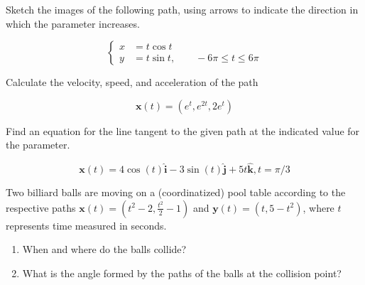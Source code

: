 \documentclass[12pt,letterpaper]{hmcpset}
\newcommand{\pn}[1]{\left( #1 \right)}
\renewcommand{\vec}[1]{\mathbf{#1}}
\let\oldhat\hat
\renewcommand{\hat}[1]{\oldhat{\mathbf{#1}}}
\begin{document}

\begin{problem}[3.1.3]
	Sketch the images of the following path, using arrows to indicate the direction in which the parameter increases.
    
    \[
    	\begin{cases}
        	x &= t \cos{t} \\
            y &= t \sin{t},\hspace{2em} -6 \pi \leq t \leq 6 \pi
        \end{cases}
    \]
\end{problem}

\begin{solution}
	
\end{solution}

\vfill
\newpage

\begin{problem}[3.1.10]
	Calculate the velocity, speed, and acceleration of the path
    
    \[
    	\vec{x}(t) = \pn{e^t, e^{2t}, 2e^t}
    \]
\end{problem}

\begin{solution}
	
\end{solution}

\vfill
\newpage

\begin{problem}[3.1.16]
	Find an equation for the line tangent to the given path at the indicated value for the parameter.
    
    \[
    	\vec{x}(t) = 4 \cos(t)\hat{i} - 3\sin(t)\hat{j} + 5t\hat{k}, t = \pi/3
    \]
\end{problem}

\begin{solution}
	
\end{solution}

\vfill
\newpage

\begin{problem}[3.1.26]
	Two   billiard   balls   are   moving   on   a   (coordinatized)  pool  table  according  to  the  respective  paths $\vec{x}(t) = \pn{t^2 - 2, \frac{t^2}{2} - 1}$ and $\vec{y}(t) = \pn{t, 5 - t^2}$, where $t$ represents time measured in seconds.
    
    
    \begin{enumerate}
		\item When and where do the balls collide?
        \item What is the angle formed by the paths of the balls at the collision point?
	\end{enumerate}
\end{problem}
\end{document}
